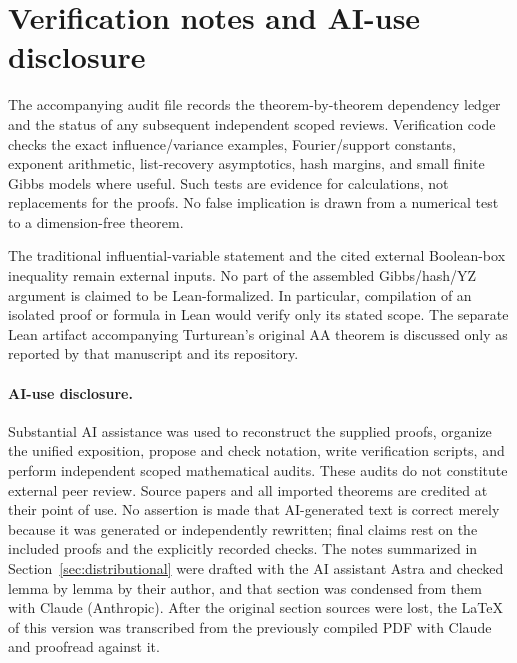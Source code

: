 \documentclass[11pt]{article}
\theoremstyle{definition}\newtheorem{definition}[theorem]{Definition}
\theoremstyle{remark}\newtheorem{remark}[theorem]{Remark}
\begin{document}
\section{Verification notes and AI-use disclosure}\label{app:verification}
The accompanying audit file records the theorem-by-theorem dependency ledger and the status of any subsequent independent scoped reviews. Verification code checks the exact influence/variance examples, Fourier/support constants, exponent arithmetic, list-recovery asymptotics, hash margins, and small finite Gibbs models where useful. Such tests are evidence for calculations, not replacements for the proofs. No false implication is drawn from a numerical test to a dimension-free theorem.

The traditional influential-variable statement and the cited external Boolean-box inequality remain external inputs. No part of the assembled Gibbs/hash/YZ argument is claimed to be Lean-formalized. In particular, compilation of an isolated proof or formula in Lean would verify only its stated scope. The separate Lean artifact accompanying Turturean's original AA theorem is discussed only as reported by that manuscript and its repository.

\paragraph{AI-use disclosure.}
Substantial AI assistance was used to reconstruct the supplied proofs, organize the unified exposition, propose and check notation, write verification scripts, and perform independent scoped mathematical audits. These audits do not constitute external peer review. Source papers and all imported theorems are credited at their point of use. No assertion is made that AI-generated text is correct merely because it was generated or independently rewritten; final claims rest on the included proofs and the explicitly recorded checks. The notes summarized in Section~\ref{sec:distributional} were drafted with the AI assistant Astra and checked lemma by lemma by their author, and that section was condensed from them with Claude (Anthropic). After the original section sources were lost, the LaTeX of this version was transcribed from the previously compiled PDF with Claude and proofread against it.
\end{document}

